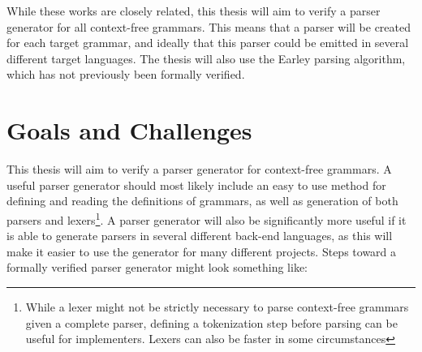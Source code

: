 \documentclass{article}
\begin{document}
	While these works are closely related, this thesis will aim to verify a
	parser generator for all context-free grammars. This means that a parser
	will be created for each target grammar, and ideally that this parser could
	be emitted in several different target languages. The thesis will also use
	the Earley parsing algorithm, which has not previously been formally
	verified.

\section{Goals and Challenges}


	This thesis will aim to verify a parser generator for context-free
	grammars. A useful parser generator should most likely include an easy to
	use method for defining and reading the definitions of grammars, as well as
	generation of both parsers and lexers\footnote{While a lexer might not be
	strictly necessary to parse context-free grammars given a complete parser,
	defining a tokenization step before parsing can be useful for implementers.
	Lexers can also be faster in some circumstances}. A parser generator will
	also be significantly more useful if it is able to generate parsers in
	several different back-end languages, as this will make it easier to use
	the generator for many different projects.  Steps toward a formally
	verified parser generator might look something like:
\end{document}
